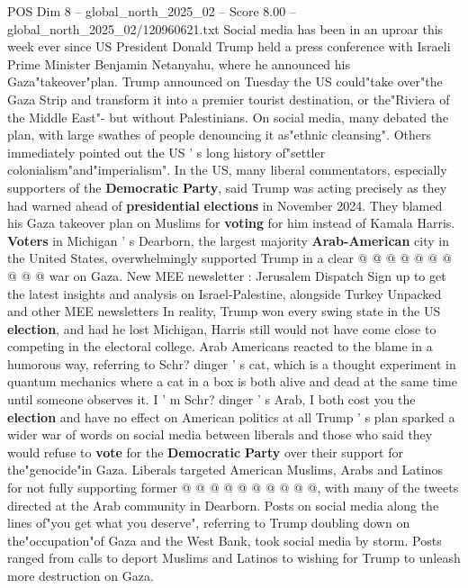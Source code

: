 \begin{textsample}{POS Dim 8 – global\_north\_2025\_02 – Score 8.00 – global\_north\_2025\_02/120960621.txt}  \label{ex:f8_pos_311}
Social media has been in an uproar this week ever since US President Donald Trump held a press conference with Israeli Prime Minister Benjamin Netanyahu, where he announced his Gaza"takeover"plan.
Trump announced on Tuesday the US could"take over"the Gaza Strip and transform it into a premier tourist destination, or the"Riviera of the Middle East"- but without Palestinians.
On social media, many debated the plan, with large swathes of people denouncing it as"ethnic cleansing".
Others immediately pointed out the US ' s long history of"settler colonialism"and"imperialism".
In the US, many liberal commentators, especially supporters of the \textbf{Democratic} \textbf{Party}, said Trump was acting precisely as they had warned ahead of \textbf{presidential} \textbf{elections} in November 2024.
They blamed his Gaza takeover plan on Muslims for \textbf{voting} for him instead of Kamala Harris. \textbf{Voters} in Michigan ' s Dearborn, the largest majority \textbf{Arab-American} city in the United States, overwhelmingly supported Trump in a clear @ @ @ @ @ @ @ @ @ @ war on Gaza.
New MEE newsletter : Jerusalem Dispatch Sign up to get the latest insights and analysis on Israel-Palestine, alongside Turkey Unpacked and other MEE newsletters In reality, Trump won every swing state in the US \textbf{election}, and had he lost Michigan, Harris still would not have come close to competing in the electoral college.
Arab Americans reacted to the blame in a humorous way, referring to Schr? dinger ' s cat, which is a thought experiment in quantum mechanics where a cat in a box is both alive and dead at the same time until someone observes it.
I ' m Schr? dinger ' s Arab, I both cost you the \textbf{election} and have no effect on American politics at all Trump ' s plan sparked a wider war of words on social media between liberals and those who said they would refuse to \textbf{vote} for the \textbf{Democratic} \textbf{Party} over their support for the"genocide"in Gaza.
Liberals targeted American Muslims, Arabs and Latinos for not fully supporting former @ @ @ @ @ @ @ @ @ @, with many of the tweets directed at the Arab community in Dearborn.
Posts on social media along the lines of"you get what you deserve", referring to Trump doubling down on the"occupation"of Gaza and the West Bank, took social media by storm.
Posts ranged from calls to deport Muslims and Latinos to wishing for Trump to unleash more destruction on Gaza.

\end{textsample}
